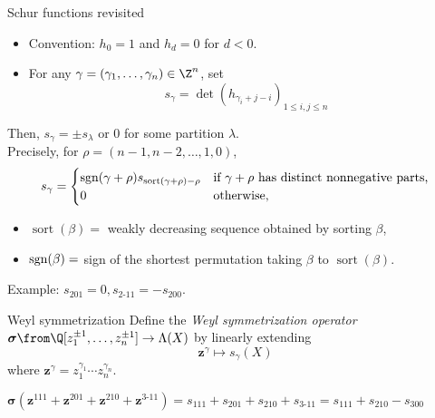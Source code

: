 \documentclass[dvipsnames]{beamer}
\newcommand{\zz}{{\boldsymbol z}}
\newcommand{\sigmabold}{\boldsymbol \sigma}
\newcommand{\sgn}{\text{\rm sgn}}
\DeclareMathOperator{\sort}{sort}
\theoremstyle{definition}
\newcounter{c}
\begin{document}
\begin{frame}{Schur functions revisited}
  \begin{itemize}
  \item Convention: \(h_0 = 1\) and \(h_d = 0\) for \(d < 0\).
  \item For any \(\gamma = (\gamma_1,\ldots,\gamma_n) \in \Z^n \), set
    \[
      s_\gamma =  \det(h_{\gamma_i+j-i})_{1 \leq i,j
        \leq n}
    \] \pause
  \end{itemize}
  Then, \(s_\gamma = \pm s_\lambda\) or 0 for some partition
  \(\lambda\). \pause\\
  
  Precisely, for \(\rho = (n-1,n-2, \ldots, 1,0)\),
  \[
    s_\gamma = 
\begin{cases}
\sgn(\gamma+\rho) s_{\sort(\gamma+\rho) -\rho} & \text{if $\gamma +
                                                 \rho$ has distinct
                                                 nonnegative parts,}\\
0                                                          & \text{otherwise,}
\end{cases}
  \]
\begin{itemize}
\item $\sort(\beta) = $ weakly decreasing sequence obtained by sorting $\beta$,
\vspace{-1mm}
\item $\sgn(\beta) =$ sign of the shortest permutation taking $\beta$ to $\sort(\beta)$.
\end{itemize}
Example: \(s_{201} = 0, s_{2\text{-}11} = -s_{200}\).
\end{frame}
\begin{frame}{Weyl symmetrization}
 Define the \emph{Weyl symmetrization operator} \(\sigmabold \from
 \Q[z_1^{\pm 1},\ldots, z_n^{\pm 1}] \to \Lambda(X)\) by linearly
 extending
 \[
   \zz^\gamma \mapsto s_\gamma(X)
 \]
 where \(\zz^\gamma = z_1^{\gamma_1} \cdots z_n^{\gamma_n}\). \pause

 \begin{example}
   \(\sigmabold(\zz^{111}+\zz^{201}+\zz^{210}+\zz^{3\text{-}11}) =
   s_{111}+s_{201}+s_{210}+s_{3\text{-}11} = s_{111}+s_{210}-s_{300}\)
 \end{example}
\end{frame}
\end{document}
